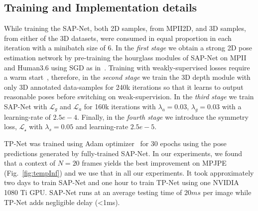 \documentclass[runningheads]{llncs}
\begin{document}
\subsection{Training and Implementation details} \label{sec:training}
While training the SAP-Net, both 2D samples, from MPII2D, and 3D samples, from either of the 3D datasets, were consumed in equal proportion in each iteration with a minibatch size of 6. In the \emph{first stage} we obtain a strong 2D pose estimation network by pre-training the hourglass modules of SAP-Net on MPII and Human3.6 using SGD as in~\cite{NewellYD16}. Training with weakly-supervised losses require a warm start~\cite{zhou2017brief}, therefore, in the \emph{second stage} we train the 3D depth module with only 3D annotated data-samples for 240k iterations so that it learns to output reasonable poses before switching on weak-supervision. In the \emph{third stage} we train SAP-Net with $\mathcal{L}_g$ and $\mathcal{L}_a$ for 160k iterations with $\lambda_a = 0.03$, $\lambda_g = 0.03$ with a learning-rate of $2.5e-4$. Finally, in the \emph{fourth stage} we introduce the symmetry loss, $\mathcal{L_s}$ with $\lambda_s = 0.05$ and learning-rate $2.5e-5$. 

TP-Net was trained using Adam optimizer~\cite{kingma2014adam} for 30 epochs using the pose predictions generated by fully-trained SAP-Net. 
In our experiments, we found that a context of $N = 20$ frames yields the best improvement on MPJPE (Fig.~\ref{fig:tempInf}) and we use that in all our experiments. It took approximately two days to train SAP-Net and one hour to train TP-Net using one NVIDIA 1080 Ti GPU. SAP-Net runs at an average testing time of $20ms$ per image while TP-Net adds negligible delay (\textless1ms).
\end{document}
